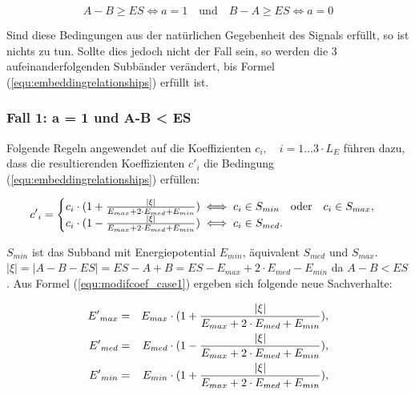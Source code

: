 	 \begin{equation}
		 A - B \geq ES \iff a = 1 \quad\mbox{und}\quad B - A \geq ES \iff a = 0 \label{equ:embeddingrelationships}
	 \end{equation}
	 
Sind diese Bedingungen aus der natürlichen Gegebenheit des Signals erfüllt, so ist nichts zu tun. Sollte dies jedoch nicht der Fall sein, so werden die 3 aufeinanderfolgenden Subbänder verändert, bis Formel (\ref{equ:embeddingrelationships}) erfüllt ist. 

\subsubsection{Fall 1: a = 1 und A-B < ES} 

Folgende Regeln angewendet auf die Koeffizienten ${c}_{i},\quad i=1\dots{3\cdot{L}_{E}}$ führen dazu, dass die resultierenden Koeffizienten ${c'}_{i}$ die Bedingung (\ref{equ:embeddingrelationships}) erfüllen:

	 \begin{equation}
		 {c'}_{i} = \begin{cases}
    	 				{c}_{i} \cdot ( 1 + { |\xi| \over {{E}_{max} + 2\cdot {E}_{med} + {E}_{min}} }) \iff {c}_{i} \in {S}_{min} \quad\mbox{oder}\quad {c}_{i} \in {S}_{max}, 
						\\
    					{c}_{i} \cdot ( 1 - { |\xi| \over {{E}_{max} + 2\cdot {E}_{med} + {E}_{min}} }) \iff {c}_{i} \in {S}_{med}.
  				  	\end{cases}
		  \label{equ:modifcoef_case1}
	 \end{equation}
	 
${S}_{min}$ ist das Subband mit Energiepotential ${E}_{min}$, äquivalent ${S}_{med}$ und ${S}_{max}$. $|\xi| = |A-B-ES| = ES-A+B = ES - {E}_{max} + 2\cdot {E}_{med} - {E}_{min}$ da $A-B<ES$. Aus Formel (\ref{equ:modifcoef_case1}) ergeben sich folgende neue Sachverhalte:
	 
	 \begin{eqnarray*}
		 {E'}_{max} & = & {E}_{max} \cdot (1 + { |\xi| \over {{E}_{max} + 2\cdot {E}_{med} + {E}_{min}} }),
		 \\ 
		 {E'}_{med} & = & {E}_{med} \cdot (1 - { |\xi| \over {{E}_{max} + 2\cdot {E}_{med} + {E}_{min}} }),
		 \\
		 {E'}_{min} & = & {E}_{min} \cdot (1 + { |\xi| \over {{E}_{max} + 2\cdot {E}_{med} + {E}_{min}} }),
	\end{eqnarray*}	 
	 
